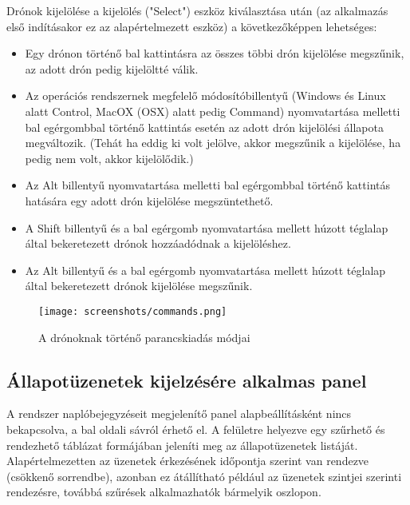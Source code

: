 Drónok kijelölése a kijelölés ("Select") eszköz kiválasztása után (az alkalmazás
első indításakor ez az alapértelmezett eszköz) a következőképpen lehetséges:
\begin{itemize}

  \item Egy drónon történő bal kattintásra az összes többi drón kijelölése
  megszűnik, az adott drón pedig kijelöltté válik.

  \item Az operációs rendszernek megfelelő módosítóbillentyű (Windows és Linux
  alatt Control, MacOX (OSX) alatt pedig Command) nyomvatartása melletti bal
  egérgombbal történő kattintás esetén az adott drón kijelölési állapota
  megváltozik. (Tehát ha eddig ki volt jelölve, akkor megszűnik a kijelölése, ha
  pedig nem volt, akkor kijelölődik.)

  \item Az Alt billentyű nyomvatartása melletti bal egérgombbal történő
  kattintás hatására egy adott drón kijelölése megszüntethető.

  \item A Shift billentyű és a bal egérgomb nyomvatartása mellett húzott
  téglalap által bekeretezett drónok hozzáadódnak a kijelöléshez.

  \item Az Alt billentyű és a bal egérgomb nyomvatartása mellett húzott
  téglalap által bekeretezett drónok kijelölése megszűnik.

\end{itemize}

\begin{figure}[H]
  \texttt{[image: screenshots/commands.png]}
  \caption{A drónoknak történő parancskiadás módjai}
  \label{fig:commands}
\end{figure}


\subsection{Állapotüzenetek kijelzésére alkalmas panel}

A rendszer naplóbejegyzéseit megjelenítő panel alapbeállításként nincs
bekapcsolva, a bal oldali sávról érhető el. A felületre helyezve egy szűrhető
és rendezhető táblázat formájában jeleníti meg az állapotüzenetek listáját.
Alapértelmezetten az üzenetek érkezésének időpontja szerint van rendezve
(csökkenő sorrendbe), azonban ez átállítható például az üzenetek szintjei
szerinti rendezésre, továbbá szűrések alkalmazhatók bármelyik oszlopon.


